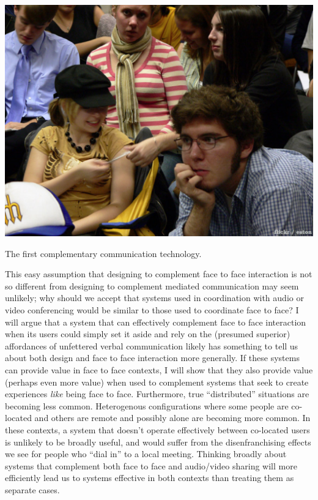 \begin{marginfigure}
	\includegraphics{figures/note-passing.png}
	\caption{The first complementary communication technology.}
	\label{fig:notes}
\end{marginfigure}


This easy assumption that designing to complement face to face interaction is not so different from designing to complement mediated communication may seem unlikely; why should we accept that systems used in coordination with audio or video conferencing would be similar to those used to coordinate face to face? I will argue that a system that can effectively complement face to face interaction when its users could simply set it aside and rely on the (presumed superior) affordances of unfettered verbal communication likely has something to tell us about both design and face to face interaction more generally. If these systems can provide value in face to face contexts, I will show that they also provide value (perhaps even more value) when used to complement systems that seek to create experiences \emph{like} being face to face. Furthermore, true ``distributed'' situations are becoming less common. Heterogenous configurations where some people are co-located and others are remote and possibly alone are becoming more common. In these contexts, a system that doesn't operate effectively between co-located users is unlikely to be broadly useful, and would suffer from the disenfranchising effects we see for people who ``dial in'' to a local meeting. Thinking broadly about systems that complement both face to face and audio/video sharing will more efficiently lead us to systems effective in both contexts than treating them as separate cases.

